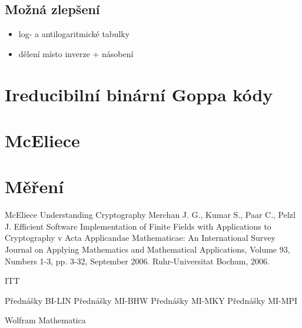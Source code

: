 \documentclass[thesis=M,czech,hidelinks]{FITthesis}[2012/06/26]
\begin{document}
\subsection{Možná zlepšení}

\begin{itemize}
    \item log- a antilogaritmické tabulky
    \item dělení místo inverze + násobení
\end{itemize}




\section{Ireducibilní binární Goppa kódy}

\section{McEliece}

\section{Měření}




\begin{conclusion}
\end{conclusion}





%
%
\begin{thebibliography}{99}

     McEliece
     Understanding Cryptography
        Merchan J. G., Kumar S., Paar C., Pelzl J. Efficient Software Implementation of
        Finite Fields with Applications to Cryptography v Acta Applicandae
        Mathematicae: An International Survey Journal on Applying Mathematics and
        Mathematical Applications, Volume 93, Numbers 1-3, pp. 3-32, September 2006.
        Ruhr-Universitat Bochum, 2006.

     ITT

     Přednášky BI-LIN
     Přednášky MI-BHW
     Přednášky MI-MKY
     Přednášky MI-MPI

     Wolfram Mathematica
\end{thebibliography}
\end{document}
